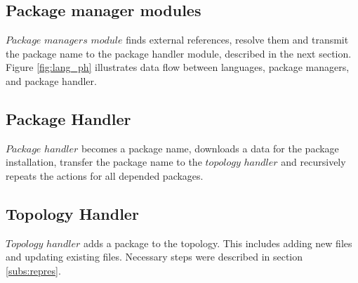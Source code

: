 \subsection{Package manager modules} \label{subs:archpmm}
$Package$ $managers$ $module$ finds external references, resolve them and transmit the package name to the package handler module, described in the next section.
Figure \ref{fig:lang_ph} illustrates data flow between languages, package managers, and package handler.


\subsection{Package Handler} \label{subs:archph}
$Package$ $handler$ becomes a package name, downloads a data for the package installation, transfer the package name to the $topology$ $handler$ and recursively repeats the actions for all depended packages.

\subsection{Topology Handler} \label{subs:archtop}
$Topology$ $handler$ adds a package to the topology. 
This includes adding new files and updating existing files. 
Necessary steps were described in section \ref{subs:repres}.